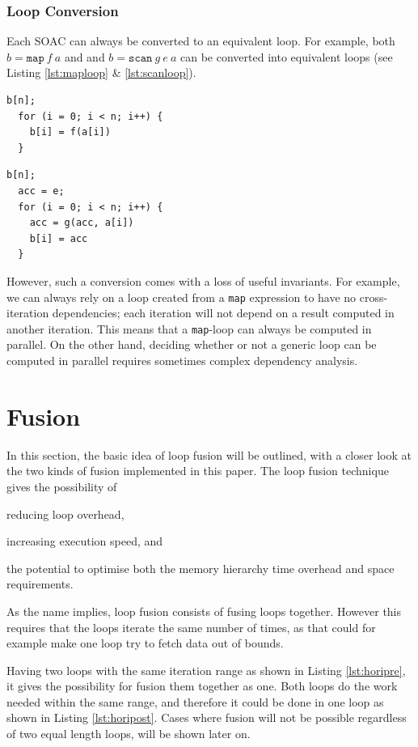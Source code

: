 \documentclass[11pt,bibliography=totocnumbered]{article}
\begin{document}
\subsubsection{Loop Conversion}
Each SOAC can always be converted to an equivalent loop. For example, both $b = \mathtt{map} \: f \: a$ and
and $b = \mathtt{scan} \: g \: e \: a$ can be converted into equivalent loops (see Listing \ref{lst:maploop} \& \ref{lst:scanloop}).
\begin{lstlisting}[caption=\texttt{map} as a loop., label={lst:maploop}]
  b[n];
  for (i = 0; i < n; i++) {
    b[i] = f(a[i])
  }
\end{lstlisting}
\begin{lstlisting}[caption=\texttt{scan} as a loop., label={lst:scanloop}]
  b[n];
  acc = e;
  for (i = 0; i < n; i++) {
    acc = g(acc, a[i])
    b[i] = acc
  }
\end{lstlisting}

However, such a conversion comes with a loss of useful invariants. For example, we can always rely on a loop created from a \texttt{map} expression to have no cross-iteration
 dependencies; each iteration will not depend on a result computed in another iteration. This means that a \texttt{map}-loop can always be computed in parallel. On the other hand,
 deciding whether or not a generic loop can be computed in parallel requires sometimes complex dependency analysis.

\section{Fusion}
In this section, the basic idea of loop fusion will be outlined, with a closer look at the two kinds of fusion implemented in this paper.
The loop fusion technique gives the possibility of
\begin{enumerate*}[label=\alph*)]
\item reducing loop overhead,
\item increasing execution speed, and
\item the potential to optimise both the memory hierarchy time overhead and space requirements.
\end{enumerate*}
 As the name implies, loop fusion consists of fusing loops together. However this requires that the loops iterate the same number of times, as that could for example make one loop try to fetch data out of bounds.

Having two loops with the same iteration range as shown in Listing \ref{lst:horipre}, it gives the possibility for fusion them together as one. Both loops do the work needed within the same range, and therefore it could be done in one loop as shown in Listing \ref{lst:horipost}. Cases where fusion will not be possible regardless of two equal length loops, will be shown later on.
\end{document}
